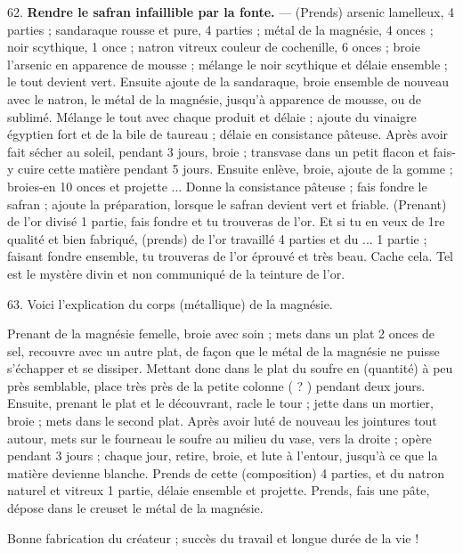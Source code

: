 \documentclass[a4paper, 11pt, oneside, polutonikogreek, french]{article}
\begin{document}
62. \textbf{Rendre le safran infaillible par la fonte.} --- (Prends) arsenic lamelleux, 4 parties ; sandaraque rousse et pure, 4 parties ; métal de la magnésie, 4 onces ; noir scythique, 1 once ; natron vitreux couleur de cochenille, 6 onces ; broie l'arsenic en apparence de mousse ; mélange le noir scythique et délaie ensemble ; le tout devient vert. Ensuite ajoute de la sandaraque, broie ensemble de nouveau avec le natron, le métal de la magnésie, jusqu'à apparence de mousse, ou de sublimé. Mélange le tout avec chaque produit et délaie ; ajoute du vinaigre égyptien fort et de la bile de taureau ; délaie en consistance pâteuse. Après avoir fait sécher au soleil, pendant 3 jours, broie ; transvase dans un petit flacon et fais-y cuire cette matière pendant 5 jours. Ensuite enlève, broie, ajoute de la gomme ; broies-en 10 onces et projette ... Donne la consistance pâteuse ; fais fondre le safran ; ajoute la préparation, lorsque le safran devient vert et friable. (Prenant) de l'or divisé 1 partie, fais fondre et tu trouveras de l'or. Et si tu en veux de 1re qualité et bien fabriqué, (prends) de l'or travaillé 4 parties et du ... 1 partie ; faisant fondre ensemble, tu trouveras de l'or éprouvé et très beau. Cache cela. Tel est le mystère divin et non communiqué de la teinture de l'or.

63. Voici l'explication du corps (métallique) de la magnésie.

Prenant de la magnésie femelle, broie avec soin ; mets dans un plat 2 onces de sel, recouvre avec un autre plat, de façon que le métal de la magnésie ne puisse s'échapper et se dissiper. Mettant donc dans le plat du soufre en (quantité) à peu près semblable, place très près de la petite colonne ( ? ) pendant deux jours. Ensuite, prenant le plat et le découvrant, racle le tour ; jette dans un mortier, broie ; mets dans le second plat. Après avoir luté de nouveau les jointures tout autour, mets sur le fourneau le soufre au milieu du vase, vers la droite ; opère pendant 3 jours ; chaque jour, retire, broie, et lute à l'entour, jusqu'à ce que la matière devienne blanche. Prends de cette (composition) 4 parties, et du natron naturel et vitreux 1 partie, délaie ensemble et projette. Prends, fais une pâte, dépose dans le creuset le métal de la magnésie.

Bonne fabrication du créateur ; succès du travail et longue durée de la vie !

\bigskip
\centerline{\EightStarTaper}
\centerline{\EightStarTaper\EightStarTaper}
\bigskip
\end{document}
